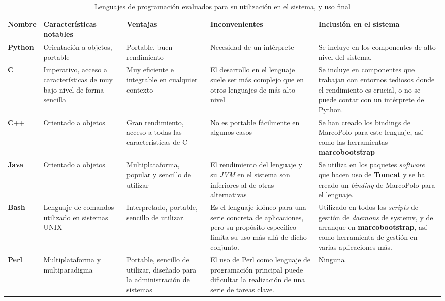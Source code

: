 \begin{landscape}
\begin{table}[H]
\begin{tabular}{|p{1.5cm}|p{3.9cm}|p{5cm}|p{5cm}|p{6.3cm}|}
\hline
Nombre & Características notables & Ventajas & Inconvenientes & Inclusión en el sistema\\ \hline

\textbf{Python} & Orientación a objetos, portable & Portable, buen rendimiento & Necesidad de un intérprete & Se incluye en los componentes de alto nivel del sistema.\\ \hline

\textbf{C} & Imperativo, acceso a características de muy bajo nivel de forma sencilla & Muy eficiente e integrable en cualquier contexto & El desarrollo en el lenguaje suele ser más complejo que en otros lenguajes de más alto nivel & Se incluye en componentes que trabajan con entornos tediosos donde el rendimiento es crucial, o no se puede contar con un intérprete de Python. \\ \hline

\textbf{C}++ & Orientado a objetos & Gran rendimiento, acceso a todas las características de C & No es portable fácilmente en algunos casos & Se han creado los bindings de MarcoPolo para este lenguaje, así como las herramientas \textbf{marcobootstrap}\\ \hline

\textbf{Java} & Orientado a objetos & Multiplataforma, popular y sencillo de utilizar & El rendimiento del lenguaje y su \textit{JVM} en el sistema son inferiores al de otras alternativas & Se utiliza en los paquetes \textit{software} que hacen uso de \textbf{Tomcat} y se ha creado un \textit{binding} de MarcoPolo para el lenguaje.\\ \hline

\textbf{Bash} & Lenguaje de comandos utilizado en sistemas UNIX & Interpretado, portable, sencillo de utilizar. & Es el lenguaje idóneo para una serie  concreta de aplicaciones, pero su propósito específico limita su uso más allá de dicho conjunto. & Utilizado en todos los \textit{scripts} de gestión de \textit{daemons} de systemv, y de arranque en \textbf{marcobootstrap}, así como herramienta de gestión en varias aplicaciones más.\\ \hline

\textbf{Perl} & Multiplataforma y multiparadigma & Portable, sencillo de utilizar, diseñado para la administración de sistemas & El uso de Perl como lenguaje de programación principal puede dificultar la realización de una serie de tareas clave. & Ninguna\\ \hline
\end{tabular}
\caption{Lenguajes de programación evaluados para su utilización en el sistema, y uso final}
\end{table}
\end{landscape}

